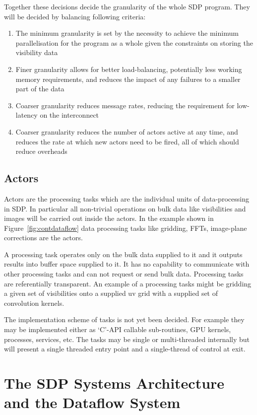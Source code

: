 \documentclass[11pt,a4paper]{article}
\begin{document}
Together these decisions decide the granularity of the whole SDP
program. They will be decided by balancing following criteria:
\begin{enumerate}
\item The minimum granularity is set by the necessity to achieve the
  minimum parallelisation for the program as a whole given the
  constraints on storing the visibility data
\item Finer granularity allows for better load-balancing, potentially
  less working memory requirements, and reduces the impact of any
  failures to a smaller part of the data
\item Coarser granularity reduces message rates, reducing the
  requirement for low-latency on the interconnect
\item Coarser granularity reduces the number of actors active at any
  time, and reduces the rate at which new actors need to be fired, all
  of which should reduce overheads
\end{enumerate}

\subsection{Actors}
Actors are the processing tasks which are the individual units of
data-processing in SDP. In particular all non-trivial operations on
bulk data like visibilities and images will be carried out inside the
actors. In the example shown in Figure~\ref{fig:contdataflow} data
processing tasks like gridding, FFTs, image-plane corrections are the
actors.

A processing task operates only on the bulk data supplied to it and it
outputs results into buffer space supplied to it. It has no capability
to communicate with other processing tasks and can not request or send
bulk data. Processing tasks are referentially transparent. An example
of a processing tasks might be gridding a given set of visibilities
onto a supplied uv grid with a supplied set of convolution kernels.

The implementation scheme of tasks is not yet been decided. For
example they may be implemented either as ‘C’-API callable
sub-routines, GPU kernels, processes, services, etc. The tasks may be
single or multi-threaded internally but will present a single threaded
entry point and a single-thread of control at exit.

\section{The SDP Systems Architecture and the Dataflow System}
\label{sec:sdp-syst-arch}
\end{document}
